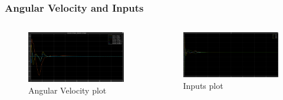 \documentclass{beamer}
\begin{document}
\begin{frame}
    \frametitle{Angular Velocity and Inputs}

    \begin{columns}

        \begin{figure}[h]
            \centering
            \includegraphics[width=1\textwidth]{omega.png}
            \caption{Angular Velocity plot}
            \label{fig:omega}
        \end{figure}

        \begin{figure}[h]
            \centering
            \includegraphics[width=1\textwidth]{Inputs.png}
            \caption{Inputs plot}
            \label{fig:inputs}
        \end{figure}
    \end{columns}
\end{frame}
\end{document}
